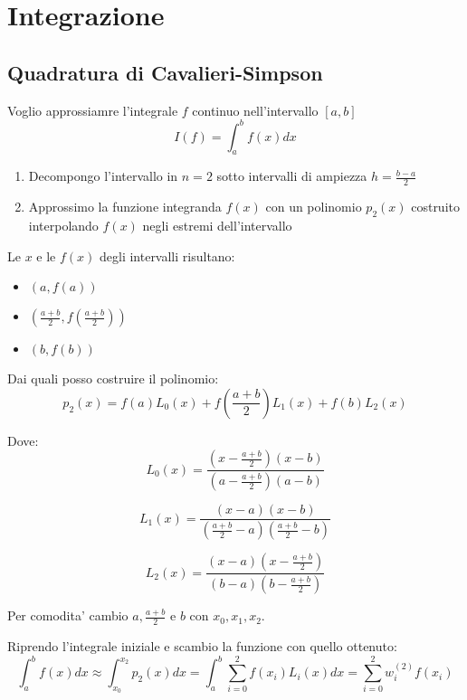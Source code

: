 \chapter{Integrazione}
\section{Quadratura di Cavalieri-Simpson}
Voglio approssiamre l'integrale $f$ continuo nell'intervallo $[a, b]$
\begin{equation*}
  I(f) = \int_a^b f(x)dx
\end{equation*}

\begin{enumerate}
  \item Decompongo l'intervallo in $n=2$ sotto intervalli di ampiezza $h=\frac{b-a}{2}$
  \item Approssimo la funzione integranda $f(x)$ con un polinomio $p_2(x)$ costruito interpolando $f(x)$ negli estremi dell'intervallo
\end{enumerate}

Le $x$ e le $f(x)$ degli intervalli risultano:
\begin{itemize}
  \item $(a, f(a))$
  \item $(\frac{a+b}{2}, f(\frac{a+b}{2}))$
  \item $(b, f(b))$
\end{itemize}

Dai quali posso costruire il polinomio:
\begin{equation*}
  p_2(x) = f(a)L_0(x) + f(\frac{a+b}{2})L_1(x) + f(b)L_2(x)
\end{equation*}

Dove:
\begin{equation*}
  L_0(x) = \frac{(x - \frac{a+b}{2})(x - b)}{(a - \frac{a+b}{2})(a - b)}
\end{equation*}

\begin{equation*}
  L_1(x) = \frac{(x - a)(x - b)}{(\frac{a+b}{2} - a)(\frac{a+b}{2} - b)}
\end{equation*}

\begin{equation*}
  L_2(x) = \frac{(x - a)(x - \frac{a+b}{2})}{(b - a)(b - \frac{a+b}{2})}
\end{equation*}

Per comodita' cambio $a, \frac{a+b}{2}$ e $b$ con $x_0, x_1, x_2$.

Riprendo l'integrale iniziale e scambio la funzione con quello ottenuto:
\begin{equation}
  \int_a^b f(x)dx \approx \int_{x_0}^{x_2} p_2(x)dx = \int_a^b \sum_{i=0}^2 f(x_i)L_i(x)dx = \sum_{i=0}^2 w_i^{(2)}f(x_i)
\end{equation}

